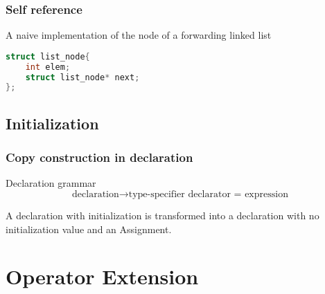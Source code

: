 \documentclass{beamer}
\begin{document}
\begin{frame}[fragile]
    \frametitle{Self reference}

    \begin{example}
        A naive implementation of the node of a forwarding linked list
        \begin{lstlisting}[language=C]
struct list_node{
    int elem;
    struct list_node* next;
};
        \end{lstlisting}
    \end{example}

\end{frame}

\subsection{Initialization}

\begin{frame}
    \frametitle{Copy construction in declaration}

    \begin{block}{Declaration grammar}
        $$
            \text{declaration}\rightarrow \text{type-specifier declarator} \textbf{ = } \text{expression}
        $$
    \end{block}

    A declaration with initialization is transformed into a declaration with no initialization value and an Assignment.

\end{frame}

\section{Operator Extension}
\end{document}
